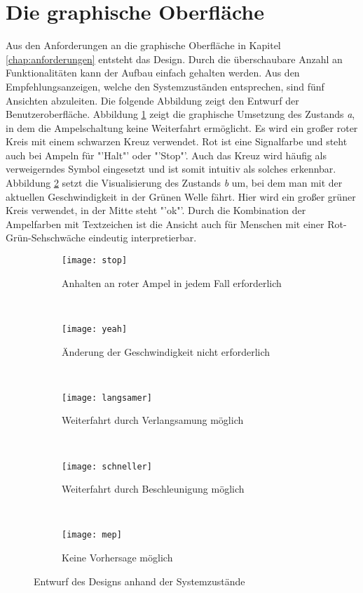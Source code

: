 \section{Die graphische Oberfläche}
Aus den Anforderungen an die graphische Oberfläche in Kapitel \ref{chap:anforderungen} entsteht das Design. Durch die überschaubare Anzahl an Funktionalitäten kann der Aufbau einfach gehalten werden. Aus den Empfehlungsanzeigen, welche den Systemzuständen entsprechen, sind fünf Ansichten abzuleiten. Die folgende Abbildung zeigt den Entwurf der Benutzeroberfläche.
Abbildung \ref{fig:stop} zeigt die graphische Umsetzung des Zustands \textit{a}, in dem die Ampelschaltung keine Weiterfahrt ermöglicht. Es wird ein großer roter Kreis mit einem schwarzen Kreuz verwendet. Rot ist eine Signalfarbe und steht auch bei Ampeln für "'Halt"' oder "'Stop"'. Auch das Kreuz wird häufig als verweigerndes Symbol eingesetzt und ist somit intuitiv als solches erkennbar.\\
Abbildung \ref{fig:yeah} setzt die Visualisierung des Zustands \textit{b} um, bei dem man mit der aktuellen Geschwindigkeit in der Grünen Welle fährt. Hier wird ein großer grüner Kreis verwendet, in der Mitte steht "'ok"'. Durch die Kombination der Ampelfarben mit Textzeichen ist die Ansicht auch für Menschen mit einer Rot-Grün-Sehschwäche eindeutig interpretierbar.
\begin{figure}[H]
        \centering
           \begin{subfigure}[t]{0.18\textwidth}
                \texttt{[image: stop]}
                \caption[Systemzustand a]{Anhalten an roter Ampel in jedem Fall erforderlich}
                \label{fig:stop}
        \end{subfigure}
           ~ 
              \begin{subfigure}[t]{0.18\textwidth}
                \texttt{[image: yeah]}
                \caption[Systemzustand b]{Änderung der Geschwindigkeit nicht erforderlich}
                \label{fig:yeah}
        \end{subfigure}
           ~
        \begin{subfigure}[t]{0.18\textwidth}
                \texttt{[image: langsamer]}
                \caption[Systemzustand c]{Weiterfahrt durch Verlangsamung möglich}
                \label{fig:langsamer}
        \end{subfigure}
        ~
        \begin{subfigure}[t]{0.18\textwidth}
                \texttt{[image: schneller]}
                \caption[Systemzustand d]{Weiterfahrt durch Beschleunigung möglich}
                \label{fig:schneller}
        \end{subfigure} 
        ~ 
        \begin{subfigure}[t]{0.18\textwidth}
        	\texttt{[image: mep]}
        	\caption[Systemzustand e]{Keine Vorhersage möglich}
            \label{fig:meh}
        \end{subfigure} 
        \grayRule
        \caption[Systemzustände im Ampelbereich]{Entwurf des Designs anhand der Systemzustände}
        \label{fig:mockup}
\end{figure}

